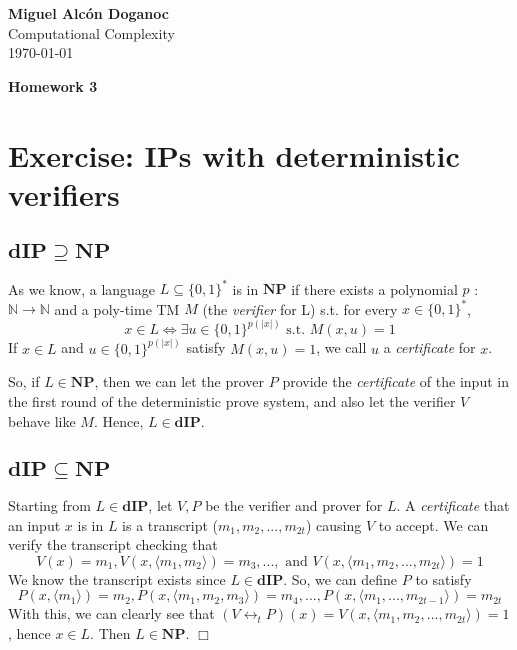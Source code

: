 \documentclass[a4paper, 10pt]{article}
\begin{document}
\noindent
\begin{flushright}
    \large\textbf{Miguel Alcón Doganoc} \\
    Computational Complexity \\
    \today
\end{flushright}

\noindent
{\huge{\textbf{Homework 3}}}

\section{Exercise: IPs with deterministic verifiers}
\subsection{$\mathbf{dIP \supseteq NP}$}
As we know, a language $L \subseteq \{0,1\}^*$ is in $\mathbf{NP}$ if there exists a polynomial $p$ : $\mathbb{N} \rightarrow \mathbb{N}$ and a poly-time TM $M$ (the \textit{verifier} for L) s.t. for every $x \in \{0,1\}^*$,
\[
    x \in L \Leftrightarrow \exists u \in \{0,1\}^{p(|x|)} \text{ s.t. } M(x,u) = 1    
\]
If $x \in L$ and $u \in \{0,1\}^{p(|x|)}$ satisfy $M(x,u) = 1$, we call $u$ a \textit{certificate} for $x$.

So, if $L \in \mathbf{NP}$, then we can let the prover $P$ provide the \textit{certificate} of the input in the first round of the deterministic prove system, and also let the verifier $V$ behave like $M$. Hence, $L \in \mathbf{dIP}$.

\subsection{$\mathbf{dIP \subseteq NP}$}
Starting from $L \in \mathbf{dIP}$, let $V,P$ be the verifier and prover for $L$. A \textit{certificate} that an input $x$ is in $L$ is a transcript ($m_1,m_2,...,m_{2t}$) causing $V$ to accept. We can verify the transcript checking that 
\[ 
    V(x) = m_1, V(x,\langle m_1, m_2\rangle) = m_3, ...,\text{ and }V(x,\langle m_1, m_2,...,m_{2t} \rangle) = 1
\]
We know the transcript exists since $L \in \mathbf{dIP}$. So, we can define $P$ to satisfy 
\[
    P(x,\langle m_1 \rangle) = m_2, P(x,\langle m_1,m_2,m_3 \rangle) = m_4,...,P(x,\langle m_1,...,m_{2t-1} \rangle) = m_{2t}
\]
With this, we can clearly see that $(V\leftrightarrow_t P)(x) = V(x,\langle m_1, m_2,...,m_{2t} \rangle) = 1$, hence $x \in L$. Then $L \in \mathbf{NP}$. $\Box$
\end{document}
